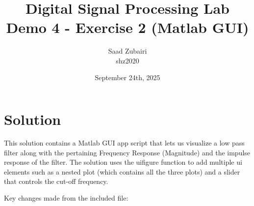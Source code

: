 \documentclass[11pt]{article}
\title{
    \vspace{3em}
    \textbf{Digital Signal Processing Lab}\\
    Demo 4 - Exercise 2 (Matlab GUI)
    \vspace{1em}
}
\author{
    Saad Zubairi \\ 
    shz2020 \\
    \vspace{1em}
}
\date{September 24th, 2025}
\begin{document}
\maketitle	

\pagebreak



\section*{Solution}

This solution contains a Matlab GUI app script that lets us visualize a low pass filter along with the pertaining Frequency Response (Magnitude) and the impulse response of the filter. The solution uses the uifigure function to add multiple ui elements such as a nested plot (which contains all the three plots) and a slider that controls the cut-off frequency. 

Key changes made from the included file:
\end{document}
